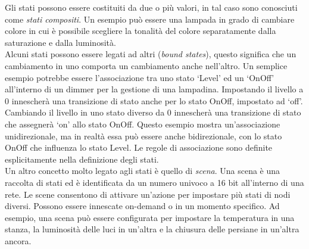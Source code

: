 \noindent Gli stati possono essere costituiti da due o più valori, in tal caso sono conosciuti come \textit{stati compositi}. Un esempio può essere una lampada in grado di cambiare colore in cui è possibile scegliere la tonalità del colore separatamente dalla saturazione e dalla luminosità.\\

\noindent Alcuni stati possono essere legati ad altri (\textit{bound states}), questo significa che un cambiamento in uno comporta un cambiamento anche nell'altro. Un semplice esempio potrebbe essere l'associazione tra uno stato `Level' ed un `OnOff' all'interno di un dimmer per la gestione di una lampadina. Impostando il livello a 0 innescherà una transizione di stato anche per lo stato OnOff, impostato ad `off'. Cambiando il livello in uno stato diverso da 0 innescherà una transizione di stato che assegnerà `on' allo stato OnOff. Questo esempio mostra un'associazione unidirezionale, ma in realtà essa può essere anche bidirezionale, con lo stato OnOff che influenza lo stato Level. Le regole di associazione sono definite esplicitamente nella definizione degli stati.\\

\noindent Un altro concetto molto legato agli stati è quello di \textit{scena}. Una scena è una raccolta di stati ed è identificata da un numero univoco a 16 bit all'interno di una rete. Le scene consentono di attivare un'azione per impostare più stati di nodi diversi. Possono essere innescate on-demand o in un momento specifico. Ad esempio, una scena può essere configurata per impostare la temperatura in una stanza, la luminosità delle luci in un'altra e la chiusura delle persiane in un'altra ancora.

